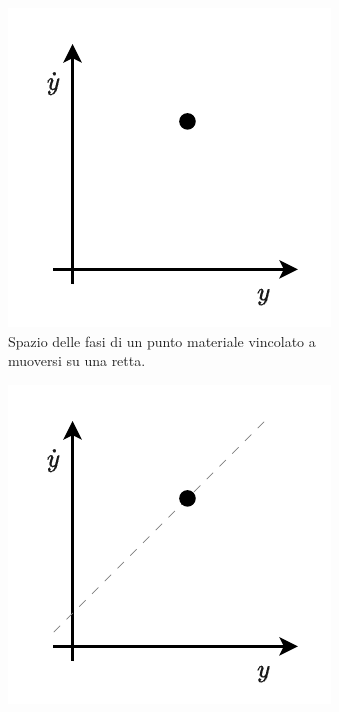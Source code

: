 \begin{example}
    \begin{figure}[H]
        \centering
        \vskip 0pt
        \begin{subfigure}[t]{0.30\textwidth}
            \centering
            \includegraphics[width=\textwidth]{assets/ex-pianocartesiano}
            \caption{Spazio delle fasi di un punto materiale vincolato a
            muoversi su una retta.}
            \label{fig:ex-pianocartesiano}
        \end{subfigure}
        \hfill
        \begin{subfigure}[t]{0.30\textwidth}
            \centering
            \includegraphics[width=\textwidth]{assets/ex-pianocartesiano-uncontrollable}

\end{subfigure}
\end{figure}
\end{example}

